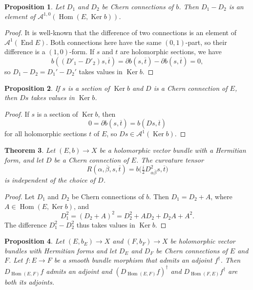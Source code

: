 \documentclass[10pt,a4paper]{amsart}
\newtheorem{theo}{Theorem}[section]
\newtheorem{prop}[theo]{Proposition}
\theoremstyle{definition}
\newcommand{\cc}[1]{\mathcal{#1}}
\def\ov#1{\overline{#1}}
\DeclareMathOperator{\Ker}{Ker}
\DeclareMathOperator{\End}{End}
\DeclareMathOperator{\Hom}{Hom}
\begin{document}
\begin{prop}
Let $D_1$ and $D_2$ be Chern connections of $b$. Then $D_1 - D_2$ is an element of $\cc A^{1,0}(\Hom(E, \Ker b))$.
\end{prop}

\begin{proof}
It is well-known that the difference of two connections is an element of $\cc A^1(\End E)$. Both connections here have the same $(0,1)$-part, so their difference is a $(1,0)$-form. If $s$ and $t$ are holomorphic sections, we have
\[
b((D'_1 - D'_2)s, \ov t)
= \partial b(s, \ov t) - \partial b(s, \ov t) = 0,
\]
so $D_1 - D_2 = D_1' - D_2'$ takes values in $\Ker b$.
\end{proof}


\begin{prop}
If $s$ is a section of $\Ker b$ and $D$ is a Chern connection of $E$, then $Ds$ takes values in $\Ker b$.
\end{prop}

\begin{proof}
If $s$ is a section of $\Ker b$, then
\[
0
= \partial b(s, \ov t)
= b(Ds, \ov t)
\]
for all holomorphic sections $t$ of $E$, so $D s \in \cc A^1(\Ker b)$.
\end{proof}


\begin{theo}
Let $(E, b) \to X$ be a holomorphic vector bundle with a Hermitian form, and let $D$ be a Chern connection of $E$. The curvature tensor
\[
R(\alpha,\ov\beta,s, \ov t)
= b\bigl(\tfrac i2 D^2_{\alpha\ov\beta}s, \ov t\bigr)
\]
is independent of the choice of $D$.
\end{theo}

\begin{proof}
Let $D_1$ and $D_2$ be Chern connections of $b$. Then $D_1 = D_2 + A$, where $A \in \Hom(E, \Ker b)$, and
\[
D_1^2
= (D_2 + A)^2
= D_2^2 + A D_2 + D_2 A + A^2.
\]
The difference $D_1^2 - D_2^2$ thus takes values in $\Ker b$.
\end{proof}




\begin{prop}
Let $(E,b_E) \to X$ and $(F,b_F) \to X$ be holomorphic vector bundles with Hermitian forms and let $D_E$ and $D_F$ be Chern connections of $E$ and $F$. Let $f : E \to F$ be a smooth bundle morphism that admits an adjoint $f^\dagger$. Then $D_{\Hom(E,F)}f$ admits an adjoint and $(D_{\Hom(E,F)}f)^\dagger$ and $D_{\Hom(F,E)}f^\dagger$ are both its adjoints.
\end{prop}
\end{document}
